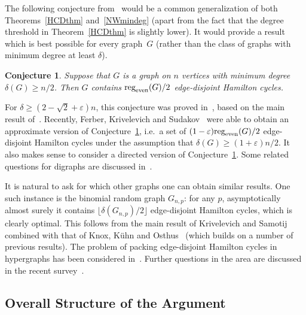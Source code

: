 \documentclass{memo-l}
\newtheorem{conjecture}[firstthm]{Conjecture}
\def\eps{\varepsilon}
\numberwithin{section}{chapter}
\numberwithin{equation}{section}
\numberwithin{firstthm}{section}
\numberwithin{figure}{section}
\begin{document}
The following conjecture from~\cite{KLOmindeg} would be a common generalization of both Theorems~\ref{HCDthm} and~\ref{NWmindeg}
(apart from the fact that the degree threshold in Theorem~\ref{HCDthm}  is slightly lower).
It would provide a result which is best possible for every graph~$G$
(rather than the class of graphs with minimum degree at least $\delta$).

\begin{conjecture} \label{con:betterconj}
Suppose that $G$ is a graph on $n$ vertices
with minimum degree $\delta(G) \ge n/2$. Then $G$ contains
$\textnormal{reg}_{\textnormal{even}}(G)/2$ edge-disjoint
Hamilton cycles.
\end{conjecture}
For $\delta\ge(2-\sqrt{2}+\eps)n$, this conjecture was proved in~\cite{KellyII}, based on the main result of~\cite{Kelly}.
Recently, Ferber, Krivelevich and Sudakov~\cite{FKS} were able to obtain an approximate version of Conjecture~\ref{con:betterconj},
i.e.~a set of $(1-\eps)\textnormal{reg}_{\textnormal{even}}(G)/2$ edge-disjoint Hamilton cycles under the assumption that
$\delta(G) \ge (1+\eps)n/2$.
It also makes sense to consider a directed version of Conjecture~\ref{con:betterconj}.
Some related questions for digraphs are discussed in~\cite{KellyII}.

It is natural to ask for which other graphs one can obtain similar results. 
One such instance is the binomial random graph $G_{n,p}$:
for any $p$, asymptotically almost surely it contains $\lfloor \delta(G_{n,p})/2 \rfloor$ edge-disjoint 
Hamilton cycles, which is clearly optimal.
This follows from the main result of Krivelevich and Samotij~\cite{KrS} combined with that of Knox, K\"uhn and Osthus~\cite{KnoxKO} 
(which builds on a number of previous results). 
The problem of packing edge-disjoint Hamilton cycles in hypergraphs has been considered in~\cite{ferber}.
Further questions in the area are discussed in the recent survey~\cite{ICM}.

\subsection{Overall Structure of the Argument}
\end{document}
